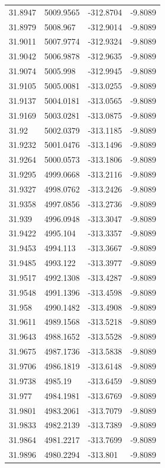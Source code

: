 \begin{table}[H]
\begin{tabular}{llll}
31.8947 & 5009.9565 & -312.8704 & -9.8089 \\
31.8979 & 5008.967 & -312.9014 & -9.8089 \\
31.9011 & 5007.9774 & -312.9324 & -9.8089 \\
31.9042 & 5006.9878 & -312.9635 & -9.8089 \\
31.9074 & 5005.998 & -312.9945 & -9.8089 \\
31.9105 & 5005.0081 & -313.0255 & -9.8089 \\
31.9137 & 5004.0181 & -313.0565 & -9.8089 \\
31.9169 & 5003.0281 & -313.0875 & -9.8089 \\
31.92 & 5002.0379 & -313.1185 & -9.8089 \\
31.9232 & 5001.0476 & -313.1496 & -9.8089 \\
31.9264 & 5000.0573 & -313.1806 & -9.8089 \\
31.9295 & 4999.0668 & -313.2116 & -9.8089 \\
31.9327 & 4998.0762 & -313.2426 & -9.8089 \\
31.9358 & 4997.0856 & -313.2736 & -9.8089 \\
31.939 & 4996.0948 & -313.3047 & -9.8089 \\
31.9422 & 4995.104 & -313.3357 & -9.8089 \\
31.9453 & 4994.113 & -313.3667 & -9.8089 \\
31.9485 & 4993.122 & -313.3977 & -9.8089 \\
31.9517 & 4992.1308 & -313.4287 & -9.8089 \\
31.9548 & 4991.1396 & -313.4598 & -9.8089 \\
31.958 & 4990.1482 & -313.4908 & -9.8089 \\
31.9611 & 4989.1568 & -313.5218 & -9.8089 \\
31.9643 & 4988.1652 & -313.5528 & -9.8089 \\
31.9675 & 4987.1736 & -313.5838 & -9.8089 \\
31.9706 & 4986.1819 & -313.6148 & -9.8089 \\
31.9738 & 4985.19 & -313.6459 & -9.8089 \\
31.977 & 4984.1981 & -313.6769 & -9.8089 \\
31.9801 & 4983.2061 & -313.7079 & -9.8089 \\
31.9833 & 4982.2139 & -313.7389 & -9.8089 \\
31.9864 & 4981.2217 & -313.7699 & -9.8089 \\
31.9896 & 4980.2294 & -313.801 & -9.8089 \\

\end{tabular}
\end{table}
